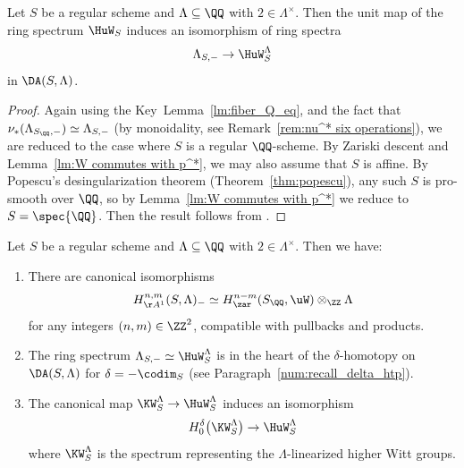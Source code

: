 \begin{thm}\label{thm:Witt motives}
Let $S$ be a regular scheme and $\Lambda \subseteq \QQ$ with $2 \in \Lambda^\times$.
Then the unit map of the ring spectrum $\HuW_S$ induces an isomorphism of ring spectra
\begin{equation*}\label{eq:W unit}
\Lambda_{S,-} \to \HuW^\Lambda_S
\end{equation*}
in $\DA(S, \Lambda)$.
\end{thm}
\begin{proof}
Again using the Key~Lemma~\ref{lm:fiber_Q_eq}, and the fact that $\nu_*(\Lambda_{S_\QQ,-}) \simeq \Lambda_{S,-}$ (by monoidality, see Remark~\ref{rem:nu^* six operations}), we are reduced to the case where $S$ is a regular $\QQ$\nobreakdash-scheme.
By Zariski descent \cite[2.3.8]{CD3} and Lemma~\ref{lm:W commutes with p^*}, we may also assume that $S$ is affine.
By Popescu's desingularization theorem (Theorem~\ref{thm:popescu}), any such $S$ is pro-smooth over $\QQ$, so by Lemma~\ref{lm:W commutes with p^*} we reduce to $S=\spec{\QQ}$.
Then the result follows from \cite[Prop.\,41]{Bachmann}.
\end{proof}

\pagebreak[2]
\begin{cor}\label{cor:comput_HA1minus}
Let $S$ be a regular scheme and $\Lambda \subseteq \QQ$ with $2 \in \Lambda^\times$.
Then we have:
\begin{enumerate}
\item
There are canonical isomorphisms
\[
H^{n,m}_{\AA^1}(S,\Lambda)_- \simeq H^{n-m}_\zar(S_\QQ,\uW) \otimes_\ZZ \Lambda
\]
for any integers $(n,m) \in \ZZ^2$, compatible with pullbacks and products.

\item
The ring spectrum $\Lambda_{S,-} \simeq \HuW_S^\Lambda$ is in the heart of the $\delta$-homotopy \tstructure on $\DA(S,\Lambda)$ for $\delta=-\codim_S$ (see Paragraph~\ref{num:recall_delta_htp}).

\item
The canonical map $\KW_S^\Lambda \to \HuW^\Lambda_S$ induces an isomorphism
\[
H_0^\delta\big(\KW_S^\Lambda\big) \to \HuW^\Lambda_S
\]
where $\KW_S^\Lambda$ is the spectrum representing the $\Lambda$-linearized higher Witt groups.
\end{enumerate}
\end{cor}

